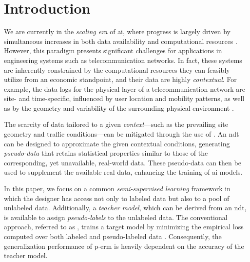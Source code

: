 \documentclass[journal]{IEEEtran}
\begin{document}
\section{Introduction}

We are currently in the \emph{scaling era} of \gls{ai}, where progress is largely driven by simultaneous increases in both data availability and computational resources \cite{xiao2024rethinking}. 
However, this paradigm presents significant challenges for applications in engineering systems such as telecommunication networks.
In fact, these systems are inherently constrained by the computational resources they can feasibly utilize from an economic standpoint, and their data are highly \emph{contextual}. 
For example, the data logs for the physical layer of a telecommunication network are site- and time-specific, influenced by user location and mobility patterns, as well as by the geometry and variability of the surrounding physical environment \cite{kaltenberger2024driving}.

The scarcity of data tailored to a given \emph{context}—such as the prevailing site geometry and traffic conditions—can be mitigated through the use of  \cite{khan2022digital, jiang2023digital, ruah2024calibrating, abouamer2024geometry, chen2024neuromorphic, sifaou2024semi, hou2025automatic}. 
An \gls{ndt} can be designed to approximate the given contextual conditions, generating \emph{pseudo-data} that retains statistical properties similar to those of the corresponding, yet unavailable, real-world data. 
These pseudo-data can then be used to supplement the available real data, enhancing the training of \gls{ai} models.

In this paper, we focus on a common \emph{semi-supervised learning} framework in which the designer has access not only to labeled data but also to a pool of unlabeled data. 
Additionally, a \emph{teacher model}, which can be derived from an \gls{ndt}, is available to assign \emph{pseudo-labels} to the unlabeled data.
The conventional approach, referred to as , trains a target model by minimizing the empirical loss computed over both labeled and pseudo-labeled data \cite{jiao2024learning}.
Consequently, the generalization performance of \gls{p-erm} is heavily dependent on the accuracy of the teacher model.
\end{document}
